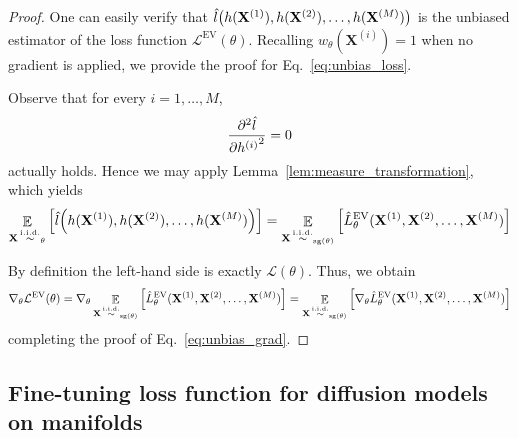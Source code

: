 \documentclass{article}
\theoremstyle{plain}
\theoremstyle{definition}
\theoremstyle{remark}
\let\P\relax
\DeclareMathOperator{\P}{\mathbb{P}}
\DeclareMathOperator{\E}{\mathbb{E}}
\DeclareMathOperator{\sg}{\mathrm{sg}}
\DeclareMathOperator{\iid}{\overset{\mathrm{i.i.d.}}{\sim}}
\begin{document}
\begin{proof}
    One can easily verify that $\hat{l}\qty(h(\mathbf{X}^{(1)}), h(\mathbf{X}^{(2)}), \dots, h(\mathbf{X}^{(M)}))$ is the unbiased estimator of the loss function $\mathcal{L}^\text{EV}(\theta)$. Recalling $w_\theta(\mathbf{X}^{(i)}) = 1$ when no gradient is applied, we provide the proof for Eq.~\eqref{eq:unbias_loss}.

    Observe that for every $i=1,\dots,M$,
    \begin{equation}
        \pdv[2]{\hat{l}}{{h^{(i)}}} = 0
    \end{equation}
    actually holds. Hence we may apply Lemma~\ref{lem:measure_transformation}, which yields
    \begin{equation}
        \E_{\mathbf{X} \iid \P_\theta} \qty[\hat{l}\qty(h(\mathbf{X}^{(1)}), h(\mathbf{X}^{(2)}), \dots, h(\mathbf{X}^{(M)}))]
        =\E_{\mathbf{X} \iid \P_{\sg(\theta)}} \qty[\hat{L}_\theta^\text{EV}(\mathbf{X}^{(1)}, \mathbf{X}^{(2)}, \dots, \mathbf{X}^{(M)})]
    \end{equation}

    By definition the left-hand side is exactly
    $\mathcal{L}(\theta)$. Thus, we obtain
    \begin{equation}
            \nabla_\theta\mathcal{L}^\text{EV}(\theta)=\nabla_\theta\E_{\mathbf{X} \iid \P_{\sg(\theta)}} \qty[\hat{L}_\theta^\text{EV}(\mathbf{X}^{(1)}, \mathbf{X}^{(2)}, \dots, \mathbf{X}^{(M)})] = \E_{\mathbf{X} \iid \P_{\sg(\theta)}} \qty[\nabla_\theta\hat{L}_\theta^\text{EV}(\mathbf{X}^{(1)}, \mathbf{X}^{(2)}, \dots, \mathbf{X}^{(M)})]
    \end{equation}
    completing the proof of Eq.~\eqref{eq:unbias_grad}.
\end{proof}

\subsection{Fine-tuning loss function for diffusion models on manifolds}
\end{document}
